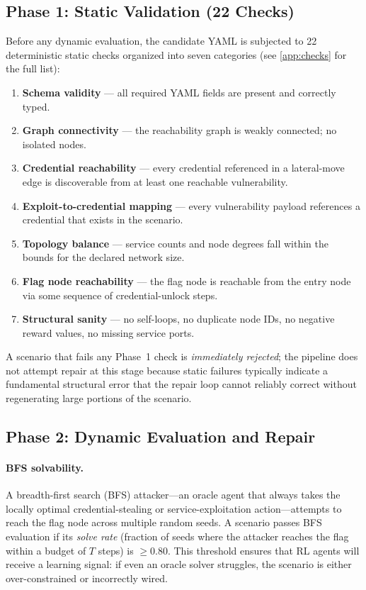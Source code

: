 \documentclass[11pt,a4paper]{article}
\begin{document}
\subsection{Phase 1: Static Validation (22 Checks)}
\label{sec:phase1}

Before any dynamic evaluation, the candidate YAML is subjected to 22
deterministic static checks organized into seven categories (see
\cref{app:checks} for the full list):

\begin{enumerate}
    \item \textbf{Schema validity} — all required YAML fields are present and
          correctly typed.
    \item \textbf{Graph connectivity} — the reachability graph is weakly
          connected; no isolated nodes.
    \item \textbf{Credential reachability} — every credential referenced in a
          lateral-move edge is discoverable from at least one reachable
          vulnerability.
    \item \textbf{Exploit-to-credential mapping} — every vulnerability payload
          references a credential that exists in the scenario.
    \item \textbf{Topology balance} — service counts and node degrees fall
          within the bounds for the declared network size.
    \item \textbf{Flag node reachability} — the flag node is reachable from
          the entry node via some sequence of credential-unlock steps.
    \item \textbf{Structural sanity} — no self-loops, no duplicate node IDs,
          no negative reward values, no missing service ports.
\end{enumerate}

A scenario that fails any Phase~1 check is \emph{immediately rejected}; the
pipeline does not attempt repair at this stage because static failures
typically indicate a fundamental structural error that the repair loop cannot
reliably correct without regenerating large portions of the scenario.

\subsection{Phase 2: Dynamic Evaluation and Repair}
\label{sec:phase2}

\paragraph{BFS solvability.}
A breadth-first search (BFS) attacker—an oracle agent that always takes the
locally optimal credential-stealing or service-exploitation action—attempts
to reach the flag node across multiple random seeds.  A scenario passes BFS
evaluation if its \emph{solve rate} (fraction of seeds where the attacker
reaches the flag within a budget of $T$ steps) is $\geq 0.80$.  This
threshold ensures that RL agents will receive a learning signal: if even an
oracle solver struggles, the scenario is either over-constrained or
incorrectly wired.
\end{document}
